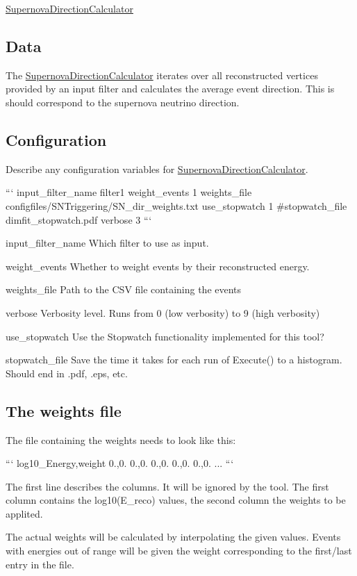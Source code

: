 \hyperlink{classSupernovaDirectionCalculator}{Supernova\-Direction\-Calculator}

\subsection*{Data}

The \hyperlink{classSupernovaDirectionCalculator}{Supernova\-Direction\-Calculator} iterates over all reconstructed vertices provided by an input filter and calculates the average event direction. This is should correspond to the supernova neutrino direction.

\subsection*{Configuration}

Describe any configuration variables for \hyperlink{classSupernovaDirectionCalculator}{Supernova\-Direction\-Calculator}.

``` input\-\_\-filter\-\_\-name filter1 weight\-\_\-events 1 weights\-\_\-file configfiles/\-S\-N\-Triggering/\-S\-N\-\_\-dir\-\_\-weights.\-txt use\-\_\-stopwatch 1 \#stopwatch\-\_\-file dimfit\-\_\-stopwatch.\-pdf verbose 3 ```


\begin{DoxyItemize}
\item {\ttfamily input\-\_\-filter\-\_\-name} Which filter to use as input.
\item {\ttfamily weight\-\_\-events} Whether to weight events by their reconstructed energy.
\item {\ttfamily weights\-\_\-file} Path to the C\-S\-V file containing the events
\item {\ttfamily verbose} Verbosity level. Runs from 0 (low verbosity) to 9 (high verbosity)
\item {\ttfamily use\-\_\-stopwatch} Use the Stopwatch functionality implemented for this tool?
\item {\ttfamily stopwatch\-\_\-file} Save the time it takes for each run of {\ttfamily Execute()} to a histogram. Should end in .pdf, .eps, etc.
\end{DoxyItemize}

\subsection*{The weights file}

The file containing the weights needs to look like this\-:

``` log10\-\_\-\-Energy,weight 0.,0. 0.,0. 0.,0. 0.,0. 0.,0. ... ```

The first line describes the columns. It will be ignored by the tool. The first column contains the {\ttfamily log10(\-E\-\_\-reco)} values, the second column the weights to be applited.

The actual weights will be calculated by interpolating the given values. Events with energies out of range will be given the weight corresponding to the first/last entry in the file. 